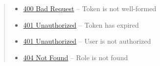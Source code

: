 \documentclass[letterpaper,10pt,english]{sphinxmanual}
\begin{document}
\begin{fulllineitems}
\begin{quote}
\begin{description}
\begin{itemize}
\item {} 
\href{http://www.w3.org/Protocols/rfc2616/rfc2616-sec10.html\#sec10.4.1}{400 Bad Request} -- Token is not well-formed

\item {} 
\href{http://www.w3.org/Protocols/rfc2616/rfc2616-sec10.html\#sec10.4.2}{401 Unauthorized} -- Token has expired

\item {} 
\href{http://www.w3.org/Protocols/rfc2616/rfc2616-sec10.html\#sec10.4.2}{401 Unauthorized} -- User is not authorized

\item {} 
\href{http://www.w3.org/Protocols/rfc2616/rfc2616-sec10.html\#sec10.4.5}{404 Not Found} -- Role is not found

\end{itemize}

\end{description}\end{quote}

\end{fulllineitems}
\end{document}
